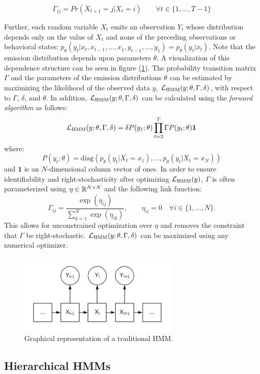 $$ \Gamma_{ij} = Pr(X_{t+1} = j | X_t = i) \qquad \forall t \in \{ 1, \ldots, T-1\} $$

Further, each random variable $X_t$ emits an observation $Y_t$ whose distribution depends only on the value of $X_t$ and none of the preceding observations or behavioral states: $p_{\theta}(y_t|x_t, x_{t-1}, \ldots , x_1, y_{t-1}, \ldots , y_1) = p_{\theta}(y_t|x_t)$. Note that the emission distribution depends upon parameters $\theta$. A visualization of this dependence structure can be seen in figure (\ref{fig:HMM}). The probability transition matrix $\Gamma$ and the parameters of the emission distributions $\theta$ can be estimated by maximizing the likelihood of the observed data $y$, $\mathcal{L}_{\text{HMM}}(y;\theta,\Gamma,\delta)$, with respect to $\Gamma$, $\delta$, and $\theta$. In addition, $\mathcal{L}_{\text{HMM}}(y;\theta,\Gamma,\delta)$ can be calculated using the \textit{forward algorithm} as follows:
%
$$\mathcal{L}_{\text{HMM}}(y;\theta,\Gamma,\delta) = \delta P(y_1;\theta) \prod_{t=2}^T \Gamma P(y_t;\theta) \mathbf{1}$$
%
where:
%
$$P(y_t;\theta) = \text{diag}(p_{\theta}(y_t|X_t = x_1), . . . , p_{\theta}(y_t|X_t = x_N ))$$
%
and $\mathbf{1}$ is an $N$-dimensional column vector of ones. In order to ensure identifiability and right-stochasticity after optimizing $\mathcal{L}_{\text{HMM}}(y)$, $\Gamma$ is often parameterized using $\eta \in \mathbb{R}^{N \times N}$ and the following link function:
%
$$\Gamma_{ij} = \frac{\exp(\eta_{ij})}{\sum_{k=1}^N \exp(\eta_{ik})}, \qquad \eta_{ii} = 0 \quad \forall i \in \{1, \ldots, N\}.$$
%
This allows for unconstrained optimization over $\eta$ and removes the constraint that $\Gamma$ be right-stochastic. $\mathcal{L}_{\text{HMM}}(y;\theta,\Gamma,\delta)$ can be maximized using any numerical optimizer.

\begin{figure}[h!]
	\centering
	\includegraphics[width=3in]{../Plots/HMM.png}
	\caption{Graphical representation of a traditional HMM.}
	\label{fig:HMM}
\end{figure}


\subsection{Hierarchical HMMs}

